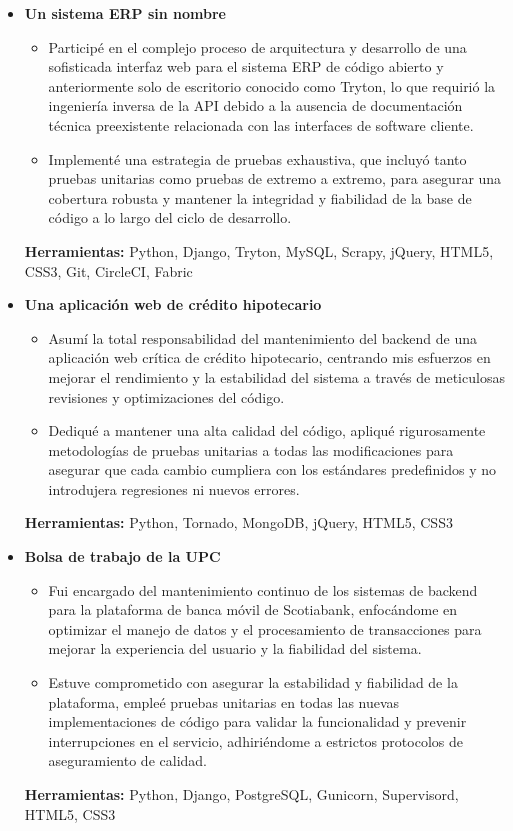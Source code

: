 \documentclass[11pt,a4paper,english]{moderncv}
\begin{document}
{
\begin{itemize}
    \item \textbf{Un sistema ERP sin nombre}
        \begin{itemize}
            \item Participé en el complejo proceso de arquitectura y desarrollo de una sofisticada interfaz web para el sistema ERP de código abierto y anteriormente solo de escritorio conocido como Tryton, lo que requirió la ingeniería inversa de la API debido a la ausencia de documentación técnica preexistente relacionada con las interfaces de software cliente.
            \item Implementé una estrategia de pruebas exhaustiva, que incluyó tanto pruebas unitarias como pruebas de extremo a extremo, para asegurar una cobertura robusta y mantener la integridad y fiabilidad de la base de código a lo largo del ciclo de desarrollo.
        \end{itemize}
        \textbf{Herramientas:} Python, Django, Tryton, MySQL, Scrapy, jQuery, HTML5, CSS3, Git, CircleCI, Fabric
    \item \textbf{Una aplicación web de crédito hipotecario}
        \begin{itemize}
            \item Asumí la total responsabilidad del mantenimiento del backend de una aplicación web crítica de crédito hipotecario, centrando mis esfuerzos en mejorar el rendimiento y la estabilidad del sistema a través de meticulosas revisiones y optimizaciones del código.
            \item Dediqué a mantener una alta calidad del código, apliqué rigurosamente metodologías de pruebas unitarias a todas las modificaciones para asegurar que cada cambio cumpliera con los estándares predefinidos y no introdujera regresiones ni nuevos errores.
        \end{itemize}
        \textbf{Herramientas:} Python, Tornado, MongoDB, jQuery, HTML5, CSS3
    \item \textbf{Bolsa de trabajo de la UPC}
        \begin{itemize}
            \item Fui encargado del mantenimiento continuo de los sistemas de backend para la plataforma de banca móvil de Scotiabank, enfocándome en optimizar el manejo de datos y el procesamiento de transacciones para mejorar la experiencia del usuario y la fiabilidad del sistema.
            \item Estuve comprometido con asegurar la estabilidad y fiabilidad de la plataforma, empleé pruebas unitarias en todas las nuevas implementaciones de código para validar la funcionalidad y prevenir interrupciones en el servicio, adhiriéndome a estrictos protocolos de aseguramiento de calidad.
        \end{itemize}
        \textbf{Herramientas:} Python, Django, PostgreSQL, Gunicorn, Supervisord, HTML5, CSS3
\end{itemize}
}
\end{document}
